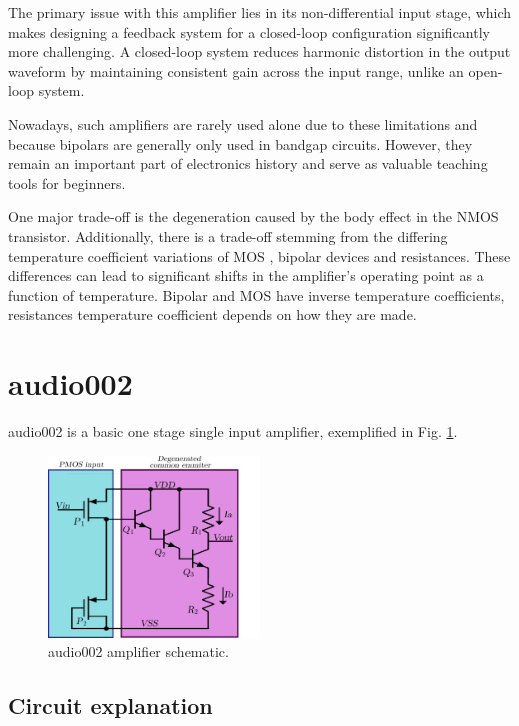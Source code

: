 \documentclass[12pt]{article}
\begin{document}
The primary issue with this amplifier lies in its non-differential input stage, which makes designing a feedback system for a closed-loop configuration significantly more challenging. A closed-loop system reduces harmonic distortion in the output waveform by maintaining consistent gain across the input range, unlike an open-loop system.

Nowadays, such amplifiers are rarely used alone due to these limitations and because bipolars are generally only used in bandgap circuits. However, they remain an important part of electronics history and serve as valuable teaching tools for beginners.

One major trade-off is the degeneration caused by the body effect in the NMOS transistor. Additionally, there is a trade-off stemming from the differing temperature coefficient variations of MOS , bipolar devices and resistances. These differences can lead to significant shifts in the amplifier's operating point as a function of temperature. Bipolar and MOS have inverse temperature coefficients, resistances temperature coefficient depends on how they are made.



\newpage


\section{audio002}

audio002 is a basic one stage single input amplifier, exemplified in Fig. \ref{audio002}.
\begin{figure}[H]
        \centering
        \includegraphics[width=0.5\textwidth]{audio002.pdf}
        \caption{audio002 amplifier schematic.}
        \label{audio002}
\end{figure}

\subsection{Circuit explanation}
\end{document}
